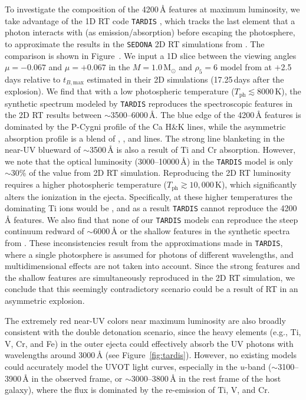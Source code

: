\documentclass[twocolumn]{aastex631}
\begin{document}
\begin{CJK*}{UTF8}{gbsn}
To investigate the composition of the 4200\,\r{A} features at maximum luminosity, we take advantage of the 1D RT code \texttt{TARDIS} \citep{Tardis_2014, tardis-sn_2019}, which tracks the last element that a photon interacts with (as emission/absorption) before escaping the photosphere, to approximate the results in the \texttt{SEDONA} 2D RT simulations from \citet{Shen_2D_2021}. The comparison is shown in Figure~. We input a 1D slice between the viewing angles $\mu=-0.067$ and $\mu=+0.067$ in the $M=1.0\,\mathrm{M_\odot}$ and $\rho_5=6$ model from \citet[adopted in the calculations of \citealp{Shen_2D_2021}]{Boos_2021} at $+$2.5\,days relative to $t_{B,\mathrm{max}}$ estimated in their 2D simulations (17.25\,days after the explosion). We find that with a low photospheric temperature ($T_\mathrm{ph}\lesssim8000$\,K), the synthetic spectrum modeled by \texttt{TARDIS} reproduces the spectroscopic features in the 2D RT results between $\sim$3500--6000\,\r{A}. The blue edge of the 4200\,\r{A} features is dominated by the P-Cygni profile of the Ca H\&K lines, while the asymmetric absorption profile is a blend of , , and  lines. The strong line blanketing in the near-UV blueward of $\sim$3500\,\r{A} is also a result of Ti and Cr absorption. However, we note that the optical luminosity (3000--10000\,\r{A}) in the \texttt{TARDIS} model is only $\sim$30\% of the value from 2D RT simulation. Reproducing the 2D RT luminosity requires a higher photospheric temperature ($T_\mathrm{ph}\gtrsim10,000$\,K), which significantly alters the ionization in the ejecta. Specifically, at these higher temperatures the dominating Ti ions would be , and as a result \texttt{TARDIS} cannot reproduce the 4200\,\r{A} features. We also find that none of our \texttt{TARDIS} models can reproduce the steep continuum redward of $\sim$6000\,\r{A} or the shallow  features in the synthetic spectra from \citet{Shen_2D_2021}. These inconsistencies result from the approximations made in \texttt{TARDIS}, where a single photosphere is assumed for photons of different wavelengths, and multidimensional effects are not taken into account. Since the strong  features and the shallow  features are simultaneously reproduced in the 2D RT simulation, we conclude that this seemingly contradictory scenario could be a result of RT in an asymmetric explosion.

The extremely red near-UV colors near maximum luminosity are also broadly consistent with the double detonation scenario, since the heavy elements (e.g., Ti, V, Cr, and Fe) in the outer ejecta could effectively absorb the UV photons with wavelengths around 3000\,\r{A} (see Figure~\ref{fig:tardis}). However, no existing models could accurately model the UVOT light curves, especially in the $u$-band ($\sim$3100--3900\,\r{A} in the observed frame, or $\sim$3000--3800\,\r{A} in the rest frame of the host galaxy), where the flux is dominated by the re-emission of Ti, V, and Cr.


\end{CJK*}
\end{document}

